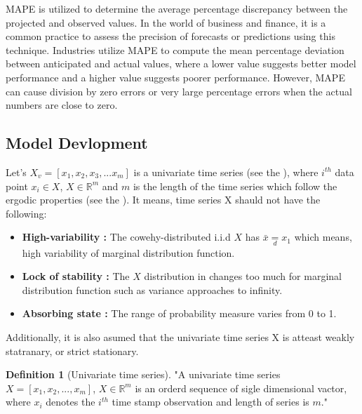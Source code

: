 \documentclass[a4paper, fleqn]{cas-sc}
\theoremstyle{definition}
\newtheorem{definition}{Definition}[section]
\theoremstyle{remark}
\begin{document}
MAPE is utilized to determine the average percentage discrepancy between the projected and observed values. In the world of business and finance,  it is a common practice to assess the precision of forecasts or predictions using this technique. Industries utilize MAPE to compute the mean percentage deviation between anticipated and actual values,  where a lower value suggests better model performance and a higher value suggests poorer performance. However,  MAPE can cause division by zero errors or very large percentage errors when the actual numbers are close to zero.




\subsection{Model Devlopment}
Let's $X_v=[ x_1, x_2, x_3, ... x_m]$ is a univariate time series (see the ),  where $i^{th}$ data point $x_i \in X$,  $X \in \mathbb{R}^m$ and $m$ is the length of the time series which follow the ergodic properties (see the ). It means,  time series X shauld not have the following: 

\begin{itemize}
  \item \textbf{High-variability : } The cowehy-distributed i.i.d $X $ has $\bar{x}\underset{d}{=} x_1$ which means,  high variability of marginal distribution function.
  \item \textbf{Lock of stability : } The $X$ distribution in changes too much for marginal distribution function such as variance approaches to infinity.
  \item \textbf{Absorbing state : } The range of probability measure varies from 0 to 1.
\end{itemize}
Additionally,  it is also asumed that the univariate time series X is atteast weakly statranary,  or strict stationary.






\begin{definition}[Univariate time series] \label{univts}
"A univariate time series $X=[x_1, x_2, ..., x_m]$,  $X\in \mathbb{R}^m$ is an orderd sequence of sigle dimensional vactor,  where $x_i$ denotes the $i^{th}$ time stamp observation and length of series is $m$."
  \end{definition}
\end{document}
